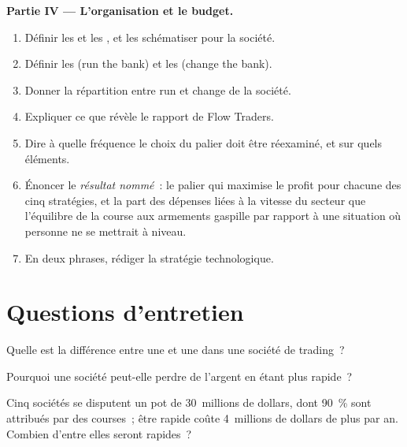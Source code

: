 \begin{problem}
\medskip\noindent\textbf{Partie IV --- L'organisation et le budget.}
\begin{enumerate}[resume]
\item Définir les  et les , et les schématiser pour la société.
\item Définir les  (run the bank) et les  (change the bank).
\item Donner la répartition entre run et change de la société.
\item Expliquer ce que révèle le rapport de Flow Traders.
\item Dire à quelle fréquence le choix du palier doit être réexaminé, et sur quels éléments.
\item Énoncer le \emph{résultat nommé}~: le palier qui maximise le profit pour chacune des cinq stratégies, et la part des dépenses liées à la vitesse du secteur que
l'équilibre de la course aux armements gaspille par rapport à une situation où personne ne se mettrait à niveau.
\item En deux phrases, rédiger la stratégie technologique.
\end{enumerate}
\end{problem}

\section{Questions d'entretien}

\begin{interviewq}\label{iq:fm:technology-strategy:1}
Quelle est la différence entre une  et une  dans une société de trading~?
\end{interviewq}

\begin{interviewq}\label{iq:fm:technology-strategy:2}
Pourquoi une société peut-elle perdre de l'argent en étant plus rapide~?
\end{interviewq}

\begin{interviewq}\label{iq:fm:technology-strategy:3}
Cinq sociétés se disputent un pot de 30~millions de dollars, dont 90~\% sont attribués par des courses~; être rapide coûte 4~millions de dollars de plus par an. Combien d'entre elles seront rapides~?
\end{interviewq}

